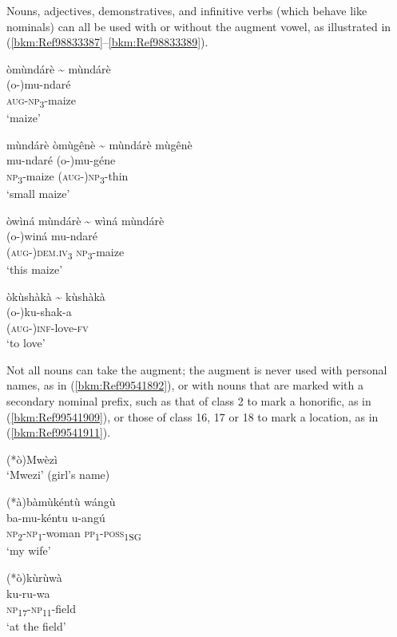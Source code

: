 \hspace*{-2.2pt}Nouns, adjectives, demonstratives, and infinitive verbs (which behave like nominals) can all be used with or without the augment vowel, as illustrated in (\ref{bkm:Ref98833387}--\ref{bkm:Ref98833389}).

\ea
\label{bkm:Ref98833387}
òmùndárè {\textasciitilde} mùndárè\\
(o-)mu-ndaré\\
\textsc{aug}-\textsc{np}\textsubscript{3}-maize\\
\glt ‘maize’
\z

\ea
mùndárè òmùgênè {\textasciitilde} mùndárè mùgênè\\
\gll mu-ndaré  (o-)mu-géne\\
\textsc{np}\textsubscript{3}-maize  (\textsc{aug}-)\textsc{np}\textsubscript{3}-thin\\
\glt ‘small maize’
\z

\ea
òwìná mùndárè {\textasciitilde} wìná mùndárè\\
\gll (o-)winá    mu-ndaré\\
(\textsc{aug}-)\textsc{dem}.\textsc{iv}\textsubscript{3}  \textsc{np}\textsubscript{3}-maize\\
\glt ‘this maize’
\z

\ea
\label{bkm:Ref98833389}
òkùshàkà {\textasciitilde} kùshàkà\\
(o-)ku-shak-a\\
(\textsc{aug}-)\textsc{inf}-love-\textsc{fv}\\
\glt ‘to love’
\z

Not all nouns can take the augment; the augment is never used with personal names, as in (\ref{bkm:Ref99541892}), or with nouns that are marked with a secondary nominal prefix, such as that of class 2 to mark a honorific, as in (\ref{bkm:Ref99541909}), or those of class 16, 17 or 18 to mark a location, as in (\ref{bkm:Ref99541911}).

\ea
\label{bkm:Ref99541892}
  (*ò)Mwèzì\\
\glt ‘Mwezi’ (girl’s name)
\z

\ea
\label{bkm:Ref99541909}
(*à)bàmùkéntù wángù\\
\gll ba-mu-kéntu  u-angú\\
\textsc{np}\textsubscript{2}-\textsc{np}\textsubscript{1}-woman  \textsc{pp}\textsubscript{1}-\textsc{poss}\textsubscript{1SG}\\
\glt ‘my wife’
\z

\ea
\label{bkm:Ref99541911}
\glll (*ò)kùrùwà\\
ku-ru-wa\\
\textsc{np}\textsubscript{17}-\textsc{np}\textsubscript{11}-field\\
\glt ‘at the field’
\z

